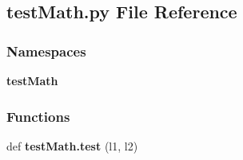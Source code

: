 \subsection{test\+Math.\+py File Reference}
\label{a00155}
\subsubsection*{Namespaces}
\begin{DoxyCompactItemize}
\item 
 \textbf{ test\+Math}
\end{DoxyCompactItemize}
\subsubsection*{Functions}
\begin{DoxyCompactItemize}
\item 
def \textbf{ test\+Math.\+test} (l1, l2)
\end{DoxyCompactItemize}
